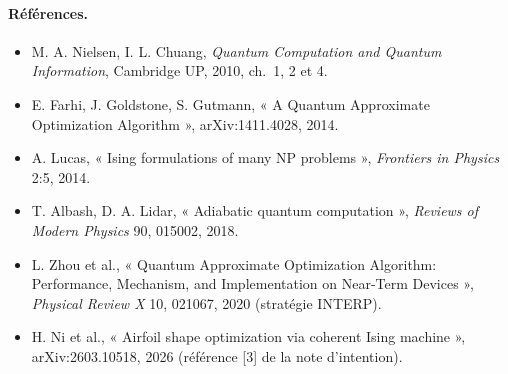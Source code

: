 \paragraph{Références.}
\begin{itemize}
\item M. A. Nielsen, I. L. Chuang, \emph{Quantum Computation and Quantum Information}, Cambridge UP, 2010, ch.~1, 2 et 4.
\item E. Farhi, J. Goldstone, S. Gutmann, « A Quantum Approximate Optimization Algorithm », arXiv:1411.4028, 2014.
\item A. Lucas, « Ising formulations of many NP problems », \emph{Frontiers in Physics} 2:5, 2014.
\item T. Albash, D. A. Lidar, « Adiabatic quantum computation », \emph{Reviews of Modern Physics} 90, 015002, 2018.
\item L. Zhou et al., « Quantum Approximate Optimization Algorithm: Performance, Mechanism, and Implementation on Near-Term Devices », \emph{Physical Review X} 10, 021067, 2020 (stratégie INTERP).
\item H. Ni et al., « Airfoil shape optimization via coherent Ising machine », arXiv:2603.10518, 2026 (référence [3] de la note d'intention).
\end{itemize}
